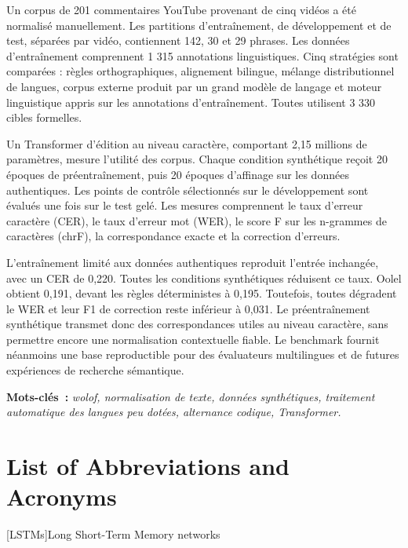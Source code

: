 \documentclass[12pt, a4paper, twoside, openany]{report}
\begin{document}
Un corpus de 201 commentaires YouTube provenant de cinq vidéos a été normalisé manuellement. Les partitions d'entraînement, de développement et de test, séparées par vidéo, contiennent 142, 30 et 29 phrases. Les données d'entraînement comprennent 1 315 annotations linguistiques. Cinq stratégies sont comparées : règles orthographiques, alignement bilingue, mélange distributionnel de langues, corpus externe produit par un grand modèle de langage et moteur linguistique appris sur les annotations d'entraînement. Toutes utilisent 3 330 cibles formelles.

Un Transformer d'édition au niveau caractère, comportant 2,15 millions de paramètres, mesure l'utilité des corpus. Chaque condition synthétique reçoit 20 époques de préentraînement, puis 20 époques d'affinage sur les données authentiques. Les points de contrôle sélectionnés sur le développement sont évalués une fois sur le test gelé. Les mesures comprennent le taux d'erreur caractère (CER), le taux d'erreur mot (WER), le score F sur les n-grammes de caractères (chrF), la correspondance exacte et la correction d'erreurs.

L'entraînement limité aux données authentiques reproduit l'entrée inchangée, avec un CER de 0,220. Toutes les conditions synthétiques réduisent ce taux. Oolel obtient 0,191, devant les règles déterministes à 0,195. Toutefois, toutes dégradent le WER et leur F1 de correction reste inférieur à 0,031. Le préentraînement synthétique transmet donc des correspondances utiles au niveau caractère, sans permettre encore une normalisation contextuelle fiable. Le benchmark fournit néanmoins une base reproductible pour des évaluateurs multilingues et de futures expériences de recherche sémantique.

\medskip
\noindent\small\textbf{\color{aivancityNavy}Mots-cl\'{e}s~:} \textit{\color{aivancityGray}wolof, normalisation de texte, données synthétiques, traitement automatique des langues peu dotées, alternance codique, Transformer.}\normalsize

\newpage

{
  \hypersetup{linkcolor=aivancityNavy}
  \tableofcontents
}
\newpage

{}
\listoffigures

{}
\listoftables
\newpage

\chapter*{List of Abbreviations and Acronyms}
[LSTMs]{Long Short-Term Memory networks}
\end{document}

